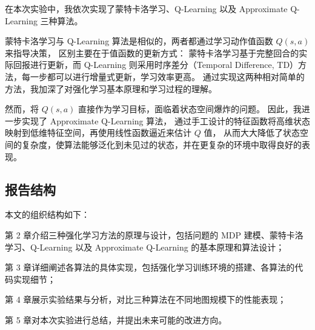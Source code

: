 在本次实验中，我依次实现了蒙特卡洛学习、Q-Learning 以及 Approximate Q-Learning 三种算法。

蒙特卡洛学习与 Q-Learning 算法是相似的，两者都通过学习动作值函数 $Q(s,a)$ 来指导决策，
区别主要在于值函数的更新方式：
蒙特卡洛学习基于完整回合的实际回报进行更新，而 Q-Learning 则采用时序差分（Temporal Difference, TD）方法，每一步都可以进行增量式更新，学习效率更高。
通过实现这两种相对简单的方法，我加深了对强化学习基本原理和学习过程的理解。

然而，将 $Q(s,a)$ 直接作为学习目标，面临着状态空间爆炸的问题。
因此，我进一步实现了 Approximate Q-Learning 算法，
通过手工设计的特征函数将高维状态映射到低维特征空间，再使用线性函数逼近来估计 $Q$ 值，
从而大大降低了状态空间的复杂度，使算法能够泛化到未见过的状态，并在更复杂的环境中取得良好的表现。


\subsection{报告结构}

本文的组织结构如下：

第 2 章介绍三种强化学习方法的原理与设计，包括问题的 MDP 建模、蒙特卡洛学习、Q-Learning 以及 Approximate Q-Learning 的基本原理和算法设计；

第 3 章详细阐述各算法的具体实现，包括强化学习训练环境的搭建、各算法的代码实现细节；

第 4 章展示实验结果与分析，对比三种算法在不同地图规模下的性能表现；

第 5 章对本次实验进行总结，并提出未来可能的改进方向。